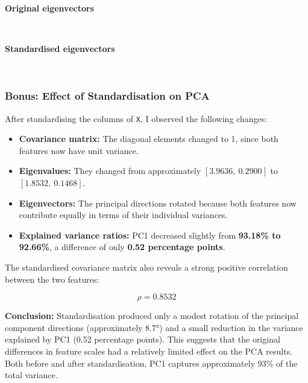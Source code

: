 \documentclass[11pt]{article}
\providecommand{\tightlist}{%
      \setlength{\itemsep}{0pt}\setlength{\parskip}{0pt}}
\begin{document}
    \textbf{Original eigenvectors}

    
    \begin{center}
    \end{center}
    { \hspace*{\fill} \\}
    
    \textbf{Standardised eigenvectors}

    
    \begin{center}
    \end{center}
    { \hspace*{\fill} \\}
    

    \subsubsection{Bonus: Effect of Standardisation on
PCA}\label{bonus-effect-of-standardisation-on-pca}

After standardising the columns of \texttt{X}, I observed the following
changes:

\begin{itemize}
\tightlist
\item
  \textbf{Covariance matrix:} The diagonal elements changed to 1, since
  both features now have unit variance.
\item
  \textbf{Eigenvalues:} They changed from approximately
  \([3.9636,\ 0.2900]\) to \([1.8532,\ 0.1468]\).
\item
  \textbf{Eigenvectors:} The principal directions rotated because both
  features now contribute equally in terms of their individual
  variances.
\item
  \textbf{Explained variance ratios:} PC1 decreased slightly from
  \textbf{93.18\% to 92.66\%}, a difference of only \textbf{0.52
  percentage points}.
\end{itemize}

The standardised covariance matrix also reveals a strong positive
correlation between the two features:

\[
\rho = 0.8532
\]

\textbf{Conclusion:} Standardisation produced only a modest rotation of
the principal component directions (approximately 8.7°) and a small
reduction in the variance explained by PC1 (0.52 percentage points).
This suggests that the original differences in feature scales had a
relatively limited effect on the PCA results. Both before and after
standardisation, PC1 captures approximately 93\% of the total variance.
\end{document}
